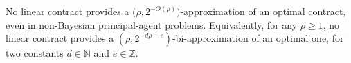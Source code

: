 \begin{theorem}\label{thm:mult_add_imp}
	No linear contract provides a $\big(  \rho ,2^{-O \left( \rho \right)} \big)$-approximation of an optimal contract, even in non-Bayesian principal-agent problems. Equivalently, for any $\rho \ge 1$, no linear contract provides a $\left(  \rho ,2^{- d \rho + e} \right)$-bi-approximation of an optimal one, for two constants $d \in \mathbb{N}$ and $e \in \mathbb{Z}$.
\end{theorem}

